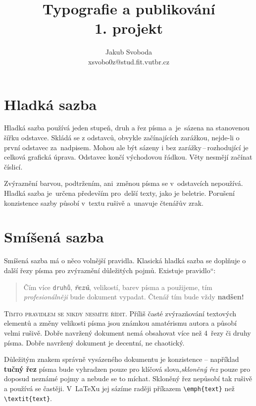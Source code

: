 \documentclass[a4paper,10pt,twocolumn]{article}
\title{Typografie a publikování \\
	{\large 1. projekt}}
\author{Jakub Svoboda\\
	xsvobo0z@stud.fit.vutbr.cz}
\date{}
\newcommand{\uvozovky}[1]{\quotedblbase #1\textquotedblleft}
\begin{document}
\maketitle

\section{Hladká sazba}
Hladká sazba používá jeden stupeň, druh a řez písma a~je~sázena na stanovenou šířku odstavce. Skládá se z odstavců, obvykle začínajících zarážkou, nejde-li o první odstavec za~nadpisem. Mohou ale být sázeny i bez zarážky\,--\,roz\-ho\-du\-jí\-cí je celková grafická úprava. Odstavec končí východovou řádkou. Věty nesmějí začínat číslicí.

Zvýraznění barvou, podtržením, ani~změnou písma se v~odstavcích nepoužívá. Hladká sazba je~určena především pro~delší texty, jako je beletrie. Porušení konzistence sazby působí v~textu rušivě a~unavuje čtenářův zrak.

\section{Smíšená sazba}

Smíšená sazba má o něco volnější pravidla. Klasická hladká sazba se doplňuje o další řezy písma pro zvýraznění důležitých pojmů. Existuje \uvozovky{pravidlo}:

\begin{quotation}
Čím více \texttt{druhů}, \textit{\textbf{řezů}}, {\small velikostí}, barev písma a {\selectfont {\small jiných efektů}} použijeme, tím \textit{profesionálněji} bude dokument vypadat. Čtenář tím {\tiny bude} vždy {\bfseries{\huge nadšen!}}
\end{quotation}

{\scshape Tímto pravidlem se nikdy nesmíte řídit.} Příliš časté zvýrazňování textových elementů a změny velikosti písma jsou známkou amatérismu autora a působí velmi rušivě. Dobře navržený dokument nemá obsahovat více než
4~řezy či druhy písma. Dobře navržený dokument je decentní, ne chaotický.

Důležitým znakem správně vysázeného dokumentu je konzistence -- například {\bfseries tučný řez} písma bude vyhradzen pouze pro klíčová slova,{\slshape skloněný řez} pouze pro doposud neznámé pojmy a nebude se to míchat. Skloněný řez nepůsobí tak rušivě a používá se častěji. V~\LaTeX u jej sázíme raději příkazem \verb|\emph{text}| než \verb|\textit{text}|.
\end{document}
